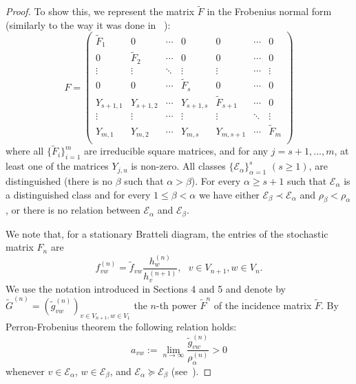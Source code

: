\documentclass[11pt, english, reqno]{amsart}
\theoremstyle{definition}
\theoremstyle{remark}
\theoremstyle{plain}
\def\tl{\widetilde}
\numberwithin{equation}{section}
\begin{document}
{\begin{proof}
To show this, we represent the matrix $\tl F$ in the Frobenius normal form
(similarly to the way it was done in~
\cite{BezuglyiKwiatkowskiMedynetsSolomyak2010}):
$$
F =\left(
  \begin{array}{ccccccc}
    \tl F_1 & 0 & \cdots & 0 & 0 & \cdots & 0 \\
    0 & \tl F_2 & \cdots & 0 & 0 & \cdots & 0 \\
    \vdots & \vdots & \ddots & \vdots & \vdots & \cdots& \vdots \\
    0 & 0 & \cdots & \tl F_s & 0 & \cdots & 0 \\
    Y_{s+1,1} & Y_{s+1,2} & \cdots & Y_{s+1,s} & \tl F_{s+1} & \cdots & 0
    \\
    \vdots & \vdots & \cdots & \vdots & \vdots & \ddots & \vdots \\
    Y_{m,1} & Y_{m,2} & \cdots & Y_{m,s} & Y_{m,s+1} & \cdots & \tl F_m
    \\
  \end{array}
\right)
$$
where all $\{\tl F_i\}_{i = 1}^m$ are irreducible square matrices, and for any
$j = s+1,\ldots,m$, at least one of the matrices $Y_{j,u}$ is non-zero. All
classes $\{\mathcal{E}_{\alpha}\}_{\alpha = 1}^s$ $(s \geq 1)$, are
distinguished (there is no $\beta$ such that $\alpha > \beta$). For every
$\alpha \geq s+1$ such that $\mathcal{E}_{\alpha}$ is a distinguished class
and for every $1 \leq \beta < \alpha $ we have either $\mathcal{E}_{\beta}
\prec \mathcal{E}_{\alpha}$ and $\rho_{\beta} < \rho_{\alpha}$, or there
is no relation between $\mathcal{E}_{\alpha}$ and $\mathcal{E}_{\beta}$.

We note that, for a stationary Bratteli diagram, the entries of the
stochastic matrix $F_n$ are
\begin{equation}\label{eq entries}
f_{vw}^{(n)} = \tl f_{vw}\frac{h_w^{(n)}}{h_v^{(n+1)}},\ \ \ v \in
V_{n+1},  w \in V_n.
\end{equation}
We use the notation introduced in Sections 4 and 5 and denote by
$\tl G^{(n)} = (\tl g^{(n)}_{vw})_{v \in V_{n+1}, w \in V_1}$ the $n$-th
power $\tl F^n$ of the incidence matrix $\tl F$. By Perron-Frobenius
 theorem the following relation holds:
\begin{equation}\label{(a)}
a_{vw} := \lim_{n \rightarrow \infty}\frac{\tl g_{vw}^{(n)}}
{\rho_{\alpha}^{(n)}} > 0
\end{equation}
whenever $v \in \mathcal{E}_{\alpha}$, $w \in \mathcal{E}_{\beta}$, and
$\mathcal{E}_{\alpha} \succeq \mathcal{E}_{\beta}$
(see~\cite[Section 4]{BezuglyiKwiatkowskiMedynetsSolomyak2010}).


\end{proof}}
\end{document}
